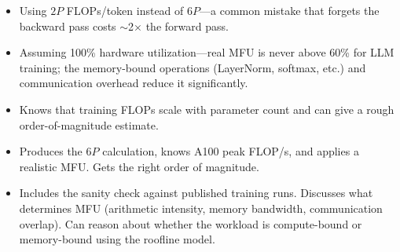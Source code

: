 \begin{interviewq}
\redflags
\begin{itemize}
    \item Using $2P$ FLOPs/token instead of $6P$---a common mistake that forgets the backward pass costs $\sim$2$\times$ the forward pass.
    \item Assuming 100\% hardware utilization---real MFU is never above 60\% for LLM training; the memory-bound operations (LayerNorm, softmax, etc.) and communication overhead reduce it significantly.
\end{itemize}


\goodgreat
\begin{itemize}
    \item {} Knows that training FLOPs scale with parameter count and can give a rough order-of-magnitude estimate.
    \item {} Produces the $6P$ calculation, knows A100 peak FLOP/s, and applies a realistic MFU. Gets the right order of magnitude.
    \item {} Includes the sanity check against published training runs. Discusses what determines MFU (arithmetic intensity, memory bandwidth, communication overlap). Can reason about whether the workload is compute-bound or memory-bound using the roofline model.
\end{itemize}

\end{interviewq}

